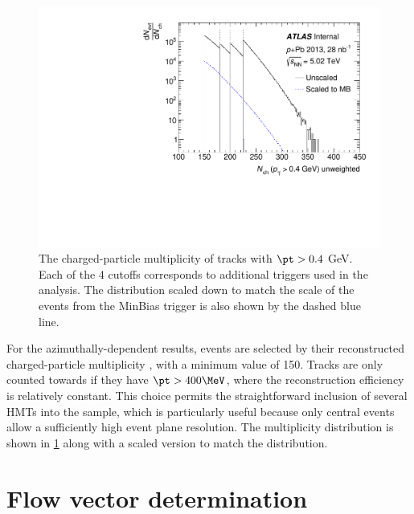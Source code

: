 \begin{figure}[t]
\centering
\includegraphics{can_nch.pdf}
\caption{The charged-particle multiplicity \Nch of tracks with $\pt > 0.4$ GeV. Each of the 4 cutoffs corresponds to additional triggers used in the analysis. The distribution scaled down to match the scale of the events from the MinBias trigger is also shown by the dashed blue line.}
\label{fig:nch}
\end{figure}

For the azimuthally-dependent results, events are selected by their reconstructed charged-particle multiplicity \Nch, with a minimum value of 150.
Tracks are only counted towards \Nch if they have $\pt > 400 \MeV$, where the reconstruction efficiency is relatively constant.
This choice permits the straightforward inclusion of several \acp{HMT} into the sample, which is particularly useful because only central events allow a sufficiently high event plane resolution.
The multiplicity distribution is shown in \cref{fig:nch} along with a scaled version to match the \minbias distribution.

\section{Flow vector determination}

